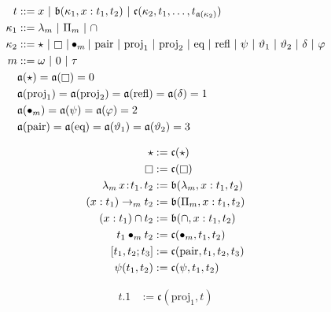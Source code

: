 
\begin{figure}
    \centering
    \begin{align*}
        t &::= x\ |\ \mathfrak{b}(\kappa_1, x : t_1, t_2)\ |\ \mathfrak{c}(\kappa_2, t_1, \ldots, t_{\mathfrak{a}(\kappa_2)}) \\
        \kappa_1 &::= \lambda_m\ |\ \Pi_m\ |\ \cap \\
        \kappa_2 &::=\star\ |\ \kind\ | \bullet_m |\ \text{pair}\ |\ \text{proj}_1\ |\ \text{proj}_2\ |\ \text{eq}\ |\ \text{refl}\ |\ \psi\ |\ \vartheta_1\ |\ \vartheta_2\ |\ \delta\ |\ \varphi  \\
        m &::= \omega\ |\ 0\ |\ \tau \\
        &\mathfrak{a}(\star) = \mathfrak{a}(\kind) = 0 \\
        &\mathfrak{a}(\text{proj}_1) = \mathfrak{a}(\text{proj}_2) = \mathfrak{a}(\text{refl}) = \mathfrak{a}(\delta) = 1 \\
        &\mathfrak{a}(\bullet_m) = \mathfrak{a}(\psi) = \mathfrak{a}(\varphi) = 2 \\
        &\mathfrak{a}(\text{pair}) = \mathfrak{a}(\text{eq}) = \mathfrak{a}(\vartheta_1) = \mathfrak{a}(\vartheta_2) = 3
    \end{align*}
    \vspace{-.4in}
    \begin{minipage}{0.5\textwidth}
        \begin{align*}
            \star &:= \mathfrak{c}(\star) \\
            \kind &:= \mathfrak{c}(\kind) \\
            \abs{\lambda_m}{x}{t_1}{t_2} &:= \mathfrak{b}(\lambda_m, x : t_1, t_2) \\
            (x : t_1) \to_m t_2 &:= \mathfrak{b}(\Pi_m, x : t_1, t_2) \\
            (x : t_1) \cap t_2 &:= \mathfrak{b}(\cap, x : t_1, t_2) \\
            t_1 \bullet_m t_2 &:= \mathfrak{c}(\bullet_m, t_1, t_2) \\
            [t_1, t_2; t_3] &:= \mathfrak{c}(\text{pair}, t_1, t_2, t_3) \\
            \psi(t_1, t_2) &:= \mathfrak{c}(\psi, t_1, t_2)
        \end{align*}
    \end{minipage}%
    \begin{minipage}{0.5\textwidth}
        \begin{align*}
            t.1 &:= \mathfrak{c}(\text{proj}_1, t) \\

\end{align*}
\end{minipage}
\end{figure}
